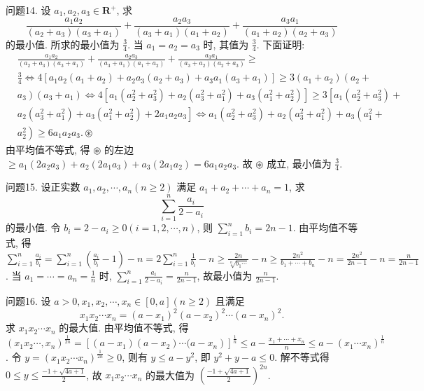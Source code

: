 问题14. 设 $a_1, a_2, a_3 \in \mathbf{R}^{+}$, 求
$$
\frac{a_1 a_2}{\left(a_2+a_3\right)\left(a_3+a_1\right)}+\frac{a_2 a_3}{\left(a_3+a_1\right)\left(a_1+a_2\right)}+\frac{a_3 a_1}{\left(a_1+a_2\right)\left(a_2+a_3\right)}
$$
的最小值.
所求的最小值为 $\frac{3}{4}$. 当 $a_1=a_2=a_3$ 时, 其值为 $\frac{3}{4}$. 下面证明:
$$
\begin{aligned}
& \frac{a_1 a_2}{\left(a_2+a_3\right)\left(a_3+a_1\right)}+\frac{a_2 a_3}{\left(a_3+a_1\right)\left(a_1+a_2\right)}+\frac{a_3 a_1}{\left(a_3+a_2\right)\left(a_2+a_3\right)} \geqslant \\
& \frac{3}{4} \Leftrightarrow 4\left[a_1 a_2\left(a_1+a_2\right)+a_2 a_3\left(a_2+a_3\right)+a_3 a_1\left(a_3+a_1\right)\right] \geqslant 3\left(a_1+a_2\right)\left(a_2+\right. \\
& \left.a_3\right)\left(a_3+a_1\right) \Leftrightarrow 4\left[a_1\left(a_2^2+a_3^2\right)+a_2\left(a_3^2+a_1^2\right)+a_3\left(a_1^2+a_2^2\right)\right] \geqslant 3\left[a_1\left(a_2^2+a_3^2\right)+\right. \\
& \left.a_2\left(a_3^2+a_1^2\right)+a_3\left(a_1^2+a_2^2\right)+2 a_1 a_2 a_3\right] \Leftrightarrow a_1\left(a_2^2+a_3^2\right)+a_2\left(a_3^2+a_1^2\right)+a_3\left(a_1^2+\right. \\
& \left.a_2^2\right) \geqslant 6 a_1 a_2 a_3. \circledast
\end{aligned}
$$
由平均值不等式, 得 $\circledast$ 的左边 $\geqslant a_1\left(2 a_2 a_3\right)+a_2\left(2 a_1 a_3\right)+ a_3\left(2 a_1 a_2\right)=6 a_1 a_2 a_3$. 故 $\circledast$ 成立, 最小值为 $\frac{3}{4}$.



问题15. 设正实数 $a_1, a_2, \cdots, a_n(n \geqslant 2)$ 满足 $a_1+a_2+\cdots+a_n=1$, 求
$$
\sum_{i=1}^n \frac{a_i}{2-a_i}
$$
的最小值.
令 $b_i=2-a_i \geqslant 0(i=1,2, \cdots, n)$, 则 $\sum_{i=1}^n b_i=2 n-1$. 由平均值不等式, 得 $\sum_{i=1}^n \frac{a_i}{b_i}=\sum_{i=1}^n\left(\frac{a_i}{b_i}-1\right)-n=2 \sum_{i=1}^n \frac{1}{b_i}-n \geqslant \frac{2 n}{\sqrt[n]{b_1 \cdots}}-n \geqslant \frac{2 n^2}{b_1+\cdots+b_n}-n=\frac{2 n^2}{2 n-1}-n=\frac{n}{2 n-1}$. 当 $a_1=\cdots=a_n=\frac{1}{n}$ 时, $\sum_{i=1}^n \frac{a_i}{2-a_i}= \frac{n}{2 n-1}$, 故最小值为 $\frac{n}{2 n-1}$.



问题16. 设 $a>0, x_1, x_2, \cdots, x_n \in[0, a](n \geqslant 2)$ 且满足
$$
x_1 x_2 \cdots x_n=\left(a-x_1\right)^2\left(a-x_2\right)^2 \cdots\left(a-x_n\right)^2 .
$$
求 $x_1 x_2 \cdots x_n$ 的最大值.
由平均值不等式, 得 $\left(x_1 x_2 \cdots, x_n\right)^{\frac{1}{2 n}}=\left[\left(a-x_1\right)\left(a-x_2\right) \cdots(a-\right. \left.\left.x_n\right)\right]^{\frac{1}{n}} \leqslant a-\frac{x_1+\cdots+x_n}{n} \leqslant a-\left(x_1 \cdots x_n\right)^{\frac{1}{n}}$. 令 $y=\left(x_1 x_2 \cdots x_n\right)^{\frac{1}{2 n}} \geqslant 0$, 则有 $y \leqslant a-y^2$, 即 $y^2+y-a \leqslant 0$. 解不等式得 $0 \leqslant y \leqslant \frac{-1+\sqrt{4 a+1}}{2}$, 故 $x_1 x_2 \cdots x_n$ 的最大值为 $\left(\frac{-1+\sqrt{4 a+1}}{2}\right)^{2 n}$.



